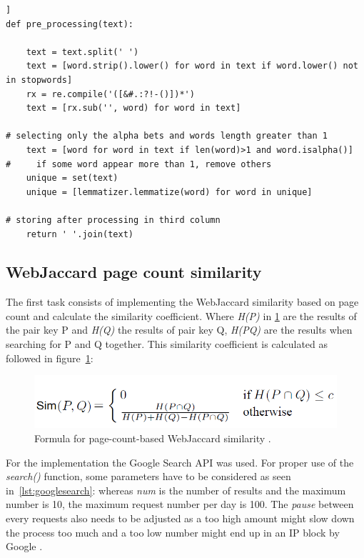 \documentclass[conference]{IEEEtran}
\begin{document}
\begin{lstlisting}[frame=single, label=lst:preproc, caption={Pre-processing for synsets of word length>1}, captionpos=b]]
def pre_processing(text):

    text = text.split(' ')
    text = [word.strip().lower() for word in text if word.lower() not in stopwords]
    rx = re.compile('([&#.:?!-()])*')
    text = [rx.sub('', word) for word in text]
    
# selecting only the alpha bets and words length greater than 1
    text = [word for word in text if len(word)>1 and word.isalpha()]
#     if some word appear more than 1, remove others
    unique = set(text)
    unique = [lemmatizer.lemmatize(word) for word in unique]
    
# storing after processing in third column
    return ' '.join(text)
\end{lstlisting}

\subsection{WebJaccard page count similarity}\label{subsec:webjac}

The first task consists of implementing the WebJaccard similarity based on page count and calculate the similarity coefficient. Where \textit{H(P)} in \ref{fig:pagecount} are the results of the pair key P and \textit{H(Q)} the results of pair key Q, \textit{H(PQ)} are the results when searching for P and Q together. This similarity coefficient  is calculated as followed in figure~\ref{fig:pagecount}:

\begin{figure}[h]
\centerline{\includegraphics[scale=0.6]{img/pagecount.png}}
\caption{Formula for page-count-based WebJaccard similarity \cite{websim}.}
\label{fig:pagecount}
\end{figure}

For the implementation the Google Search API was used. For proper use of the \textit{search()} function, some parameters have to be considered as seen in~\ref{lst:googlesearch}: whereas \textit{num} is the number of results and the maximum number is 10, the maximum request number per day is 100. The \textit{pause} between every requests also needs to be adjusted as a too high amount might slow down the process too much and a too low number might end up in an IP block by Google \cite{search}.
\end{document}
